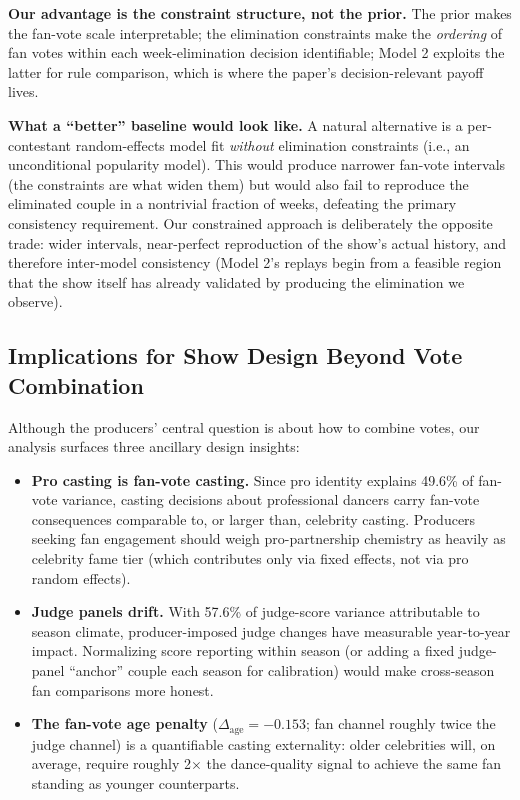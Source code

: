 \documentclass{article}
\begin{document}
\textbf{Our advantage is the constraint structure, not the prior.} The prior makes the fan-vote scale interpretable; the elimination constraints make the \emph{ordering} of fan votes within each week-elimination decision identifiable; Model 2 exploits the latter for rule comparison, which is where the paper's decision-relevant payoff lives.

\textbf{What a ``better'' baseline would look like.} A natural alternative is a per-contestant random-effects model fit \emph{without} elimination constraints (i.e., an unconditional popularity model). This would produce narrower fan-vote intervals (the constraints are what widen them) but would also fail to reproduce the eliminated couple in a nontrivial fraction of weeks, defeating the primary consistency requirement. Our constrained approach is deliberately the opposite trade: wider intervals, near-perfect reproduction of the show's actual history, and therefore inter-model consistency (Model 2's replays begin from a feasible region that the show itself has already validated by producing the elimination we observe).

\subsection{Implications for Show Design Beyond Vote Combination}

Although the producers' central question is about how to combine votes, our analysis surfaces three ancillary design insights:

\begin{itemize}
  \item \textbf{Pro casting is fan-vote casting.} Since pro identity explains 49.6\% of fan-vote variance, casting decisions about professional dancers carry fan-vote consequences comparable to, or larger than, celebrity casting. Producers seeking fan engagement should weigh pro-partnership chemistry as heavily as celebrity fame tier (which contributes only via fixed effects, not via pro random effects).
  \item \textbf{Judge panels drift.} With 57.6\% of judge-score variance attributable to season climate, producer-imposed judge changes have measurable year-to-year impact. Normalizing score reporting within season (or adding a fixed judge-panel ``anchor'' couple each season for calibration) would make cross-season fan comparisons more honest.
  \item \textbf{The fan-vote age penalty} ($\Delta_{\text{age}} = -0.153$; fan channel roughly twice the judge channel) is a quantifiable casting externality: older celebrities will, on average, require roughly 2$\times$ the dance-quality signal to achieve the same fan standing as younger counterparts.
\end{itemize}
\end{document}
